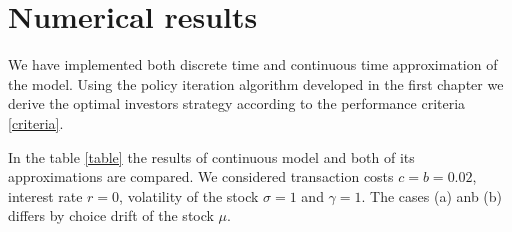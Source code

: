 \newpage
\section{Numerical results}

We have implemented both discrete time and continuous time approximation of the model. Using the policy iteration algorithm developed in the first chapter we derive the optimal investors strategy according to the performance criteria \eqref{criteria}. 

In the table \ref{table} the results of continuous model and both of its approximations are compared. We considered transaction costs $c=b=0.02$, interest rate $r=0$, volatility of the stock $\sigma=1$ and $\gamma=1$. The cases (a) anb (b) differs by choice drift of the stock $\mu$. 

\begin{table}[h!]
    \caption{Results comparison}
    \begin{center}
        \hspace{1cm}    
    
        \label{table}
    \end{center}
    
\end{table}

